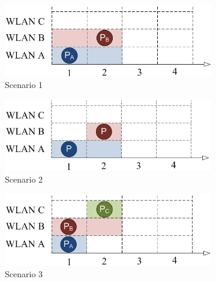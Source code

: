 \documentclass[a4paper]{article}
\begin{document}
	\begin{figure}[h]
	\centering
	  \begin{subfigure}[b]{0.475\textwidth}
	    \centering
	    \includegraphics[width=\textwidth]{images/channel_bonding_scenario1.png}
	    \caption[]%
	    {{\small Scenario 1}}    
	    \label{fig:channel_bonding_scenario1}
	  \end{subfigure}
	  \hfill
	  \begin{subfigure}[b]{0.475\textwidth}  
	    \centering 
	    \includegraphics[width=\textwidth]{images/channel_bonding_scenario2.png}
	    \caption[]%
	    {{\small Scenario 2}}
	    \label{fig:channel_bonding_scenario2}
	  \end{subfigure}
	    \begin{subfigure}[b]{0.475\textwidth}
	    \centering
	    \includegraphics[width=\textwidth]{images/channel_bonding_scenario3.png}
	    \caption[]%
	    {{\small Scenario 3}}    
	    \label{fig:channel_bonding_scenario3}
	  \end{subfigure}
	  \hfill
	  \begin{subfigure}[b]{0.475\textwidth}  

\end{subfigure}
\end{figure}
\end{document}
